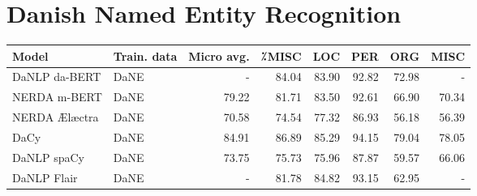 \documentclass[main.tex]{subfiles}
\begin{document}
\section{Danish Named Entity Recognition}%
\label{sec:nerres}
\begin{table}                                                                                                                                                                                                                           
        \begin{center}                                                                                                                                                                                                                  
                \begin{tabular}{l l r r r r r r}                                                                                                                                                                                        
                        Model & Train. data & Micro avg. & ⁒MISC & LOC & PER & ORG & MISC \\                                                                                                                                          
                        \hline                                                                                                                                                                                                          
                        DaNLP da-BERT & DaNE & - & 84.04 & 83.90 & 92.82 & 72.98 & - \\                                                                                                                                                 
                        NERDA m-BERT & DaNE & 79.22 & 81.71 & 83.50 & 92.61 & 66.90 & 70.34 \\                                                                                                                                          
                        NERDA Ælæctra & DaNE & 70.58 & 74.54 & 77.32 & 86.93 & 56.18 & 56.39 \\                     
                        DaCy & DaNE & 84.91 & 86.89 & 85.29 & 94.15 & 79.04 & 78.05 \\                              
                        DaNLP spaCy & DaNE & 73.75 & 75.73 & 75.96 & 87.87 & 59.57 & 66.06 \\                       
                        DaNLP Flair & DaNE & - & 81.78 & 84.82 & 93.15 & 62.95 & - \\                               

\end{tabular}
\end{center}
\end{table}
\end{document}
